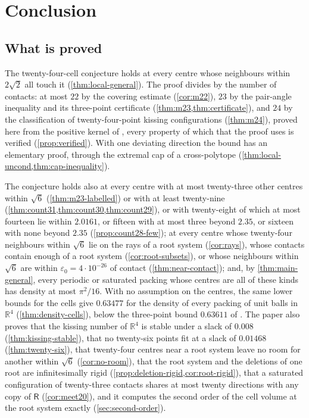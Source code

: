 \documentclass[11pt,reqno]{amsart}
\renewcommand{\_}{\origunderscore\allowbreak}
\numberwithin{equation}{section}
\theoremstyle{plain}
\theoremstyle{definition}
\theoremstyle{remark}
\newcommand{\Rt}{\mathsf{R}}                 %
\begin{document}
\section{Conclusion}\label{sec:status}

\subsection{What is proved}

The twenty-four-cell conjecture holds at every centre whose neighbours
within $2\sqrt2$ all touch it (\cref{thm:local-general}). The proof divides
by the number of contacts: at most $22$ by the covering estimate
(\cref{cor:m22}), $23$ by the pair-angle inequality and its three-point
certificate (\cref{thm:m23,thm:certificate}), and $24$ by the classification
of twenty-four-point kissing configurations (\cref{thm:m24}), proved here
from the positive kernel of \cite{LLM24}, every property of which that the
proof uses is verified (\cref{prop:verified}). With one deviating direction
the bound has an elementary proof, through the extremal cap of a
cross-polytope (\cref{thm:local-uncond,thm:cap-inequality}).

The conjecture holds also at every centre with at most twenty-three other
centres within $\sqrt6$ (\cref{thm:m23-labelled}) or with at least
twenty-nine (\cref{thm:count31,thm:count30,thm:count29}), or with twenty-eight
of which at most fourteen lie within $2.0161$, or fifteen with at most three
beyond $2.35$, or sixteen with none beyond $2.35$ (\cref{prop:count28-few}); at every centre whose
twenty-four neighbours within
$\sqrt6$ lie on the rays of a root system (\cref{cor:rays}), whose contacts
contain enough of a root system (\cref{cor:root-subsets}), or whose
neighbours within $\sqrt6$ are within $\varepsilon_0=4\cdot10^{-26}$ of
contact (\cref{thm:near-contact}); and, by \cref{thm:main-general}, every
periodic or saturated packing whose centres are all of these kinds has
density at most $\pi^2/16$. With no assumption on the centres, the same
lower bounds for the cells give $0.63477$ for the density of every packing
of unit balls in $\mathbb{R}^4$ (\cref{thm:density-cells}), below the
three-point bound $0.63611$ of \cite{CdLS22}. The paper also proves that the kissing
number of $\mathbb{R}^4$ is stable under a slack of $0.008$
(\cref{thm:kissing-stable}), that no twenty-six points fit at a slack of
$0.01468$ (\cref{thm:twenty-six}), that twenty-four centres near a root system
leave no room for another within $\sqrt6$ (\cref{cor:no-room}), that the
root system and the deletions of one root are infinitesimally rigid
(\cref{prop:deletion-rigid,cor:root-rigid}), that a saturated configuration
of twenty-three contacts shares at most twenty directions with any copy of
$\Rt$ (\cref{cor:meet20}), and it computes the second order of the cell
volume at the root system exactly (\cref{sec:second-order}).
\end{document}
